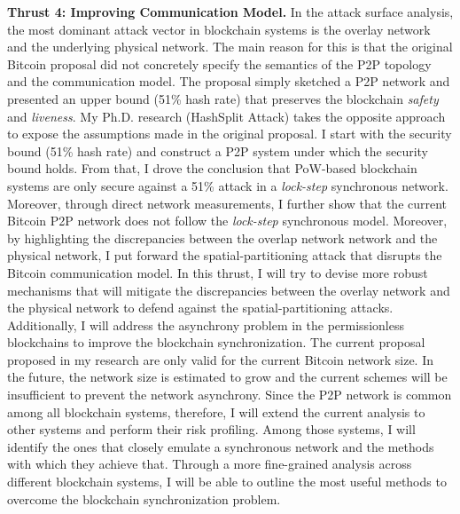 \documentclass{NSF}
\newcommand{\BfPara}[1]{{\noindent\textbf{#1.}}\xspace}
\begin{document}
\BfPara{Thrust 4: Improving Communication Model} In the attack surface analysis, the most dominant attack vector in blockchain systems is the overlay network and the underlying physical network. The main reason for this is that the original Bitcoin proposal did not concretely specify the semantics of the P2P topology and the communication model. The proposal simply sketched a P2P network and presented an upper bound (51\% hash rate) that preserves the blockchain {\em safety} and {\em liveness}. My Ph.D. research (HashSplit Attack) takes the opposite approach to expose the assumptions made in the original proposal. I start with the security bound (51\% hash rate) and construct a P2P system under which the security bound holds. From that, I drove the conclusion that PoW-based blockchain systems are only secure against a 51\% attack in a {\em lock-step} synchronous network. Moreover, through direct network measurements, I further show that the current Bitcoin P2P network does not follow the {\em lock-step} synchronous model. Moreover, by highlighting the discrepancies between the overlap network network and the physical network, I put forward the spatial-partitioning attack that disrupts the Bitcoin communication model. In this thrust, I will try to devise more robust mechanisms that will mitigate the discrepancies between the overlay network and the physical network to defend against the spatial-partitioning attacks. Additionally, I will address the asynchrony problem in the permissionless blockchains to improve the blockchain synchronization. The current proposal proposed in my research are only valid for the current Bitcoin network size. In the future, the network size is estimated to grow and the current schemes will be insufficient to prevent the network asynchrony. Since the P2P network is common among all blockchain systems, therefore, I will extend the current analysis to other systems and perform their risk profiling. Among those systems, I will identify the ones that closely emulate a synchronous network and the methods with which they achieve that. Through a more fine-grained analysis across different blockchain systems, I will be able to outline the most useful methods to overcome the blockchain synchronization problem. 
\end{document}
